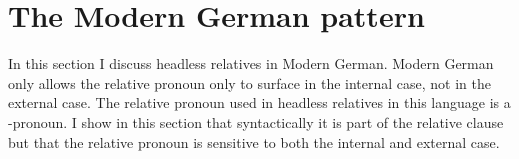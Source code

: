 





\section{The Modern German pattern}


In this section I discuss headless relatives in Modern German. Modern German only allows the relative pronoun only to surface in the internal case, not in the external case. The relative pronoun used in headless relatives in this language is a -pronoun. I show in this section that syntactically it is part of the relative clause but that the relative pronoun is sensitive to both the internal and external case.


